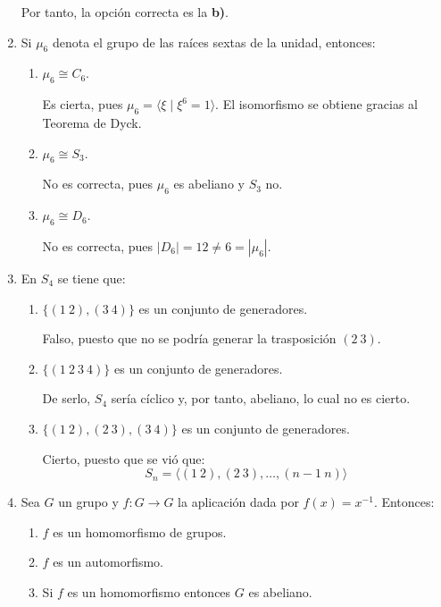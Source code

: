 \documentclass[12pt]{article}
\begin{document}
\begin{ejercicio}
\begin{enumerate}
            Por tanto, la opción correcta es la \textbf{b)}.
            \item Si $\mu_6$ denota el grupo de las raíces sextas de la unidad, entonces:
            \begin{enumerate}
                \item $\mu_6 \cong C_6$.
                
                Es cierta, pues $\mu_6=\langle \xi\mid \xi^6=1\rangle$. El isomorfismo se obtiene gracias al Teorema de Dyck.
                \item $\mu_6 \cong S_3$.
                
                No es correcta, pues $\mu_6$ es abeliano y $S_3$ no.
                \item $\mu_6 \cong D_6$.
                
                No es correcta, pues $|D_6|=12\neq 6=|\mu_6|$.
            \end{enumerate}
            \item En $S_4$ se tiene que:
            \begin{enumerate}
                \item $\{(1\ 2),(3\ 4)\}$ es un conjunto de generadores.
                
                Falso, puesto que no se podría generar la trasposición $(2\ 3)$.
                \item $\{(1\ 2\ 3\ 4)\}$ es un conjunto de generadores.
                
                De serlo, $S_4$ sería cíclico y, por tanto, abeliano, lo cual no es cierto.
                \item $\{(1\ 2),(2\ 3),(3\ 4)\}$ es un conjunto de generadores.
                
                Cierto, puesto que se vió que:
                \begin{equation*}
                    S_n=\langle (1\ 2),(2\ 3),\ldots,(n-1\ n)\rangle
                \end{equation*}
            \end{enumerate}
            \item Sea $G$ un grupo y $f : G \to G$ la aplicación dada por $f(x) = x^{-1}$. Entonces:
            \begin{enumerate}
                \item $f$ es un homomorfismo de grupos.
                \item $f$ es un automorfismo.
                \item Si $f$ es un homomorfismo entonces $G$ es abeliano.
            \end{enumerate}


\end{enumerate}
\end{ejercicio}
\end{document}

